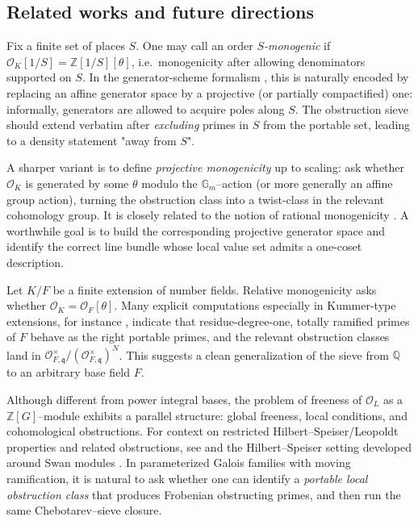 \documentclass[11pt,letterpaper]{amsart}
\theoremstyle{plain}
\theoremstyle{definition}
\theoremstyle{remark}
\theoremstyle{plain}
\begin{document}
\subsection{Related works and future directions}


Fix a finite set of places $S$. One may call an order \emph{$S$-monogenic} if
$\mathcal{O}_K[1/S]=\mathbb{Z}[1/S][\theta]$, i.e.\ monogenicity after allowing denominators
supported on $S$. In the generator-scheme formalism \cite{ABHS-I,ABHS-II}, this is naturally
encoded by replacing an affine generator space by a projective (or partially compactified) one:
informally, generators are allowed to acquire poles along $S$.
The obstruction sieve should extend verbatim after \emph{excluding} primes in $S$ from the portable set, leading to a density statement "away from $S$".

A sharper variant is to define \emph{projective monogenicity} up to scaling: ask whether $\mathcal{O}_K$ is generated by some $\theta$ modulo the $\mathbb{G}_m$--action (or more generally an affine group action), turning the obstruction class into a twist-class in
the relevant cohomology group. It is closely related to the notion of rational monogenicity \cite{Eve23, EG24}.
A worthwhile goal is to build the corresponding projective generator space and identify the correct
line bundle whose local value set admits a one-coset description. 


Let $K/F$ be a finite extension of number fields. Relative monogenicity asks whether
$\mathcal{O}_K=\mathcal{O}_F[\theta]$. Many explicit computations especially in Kummer-type extensions, for instance \cite{SmithRadical2021}, indicate that residue-degree-one,
totally ramified primes of $F$ behave as the right portable primes, and the relevant obstruction
classes land in $\mathcal{O}_{F,\mathfrak{q}}^\times/(\mathcal{O}_{F,\mathfrak{q}}^\times)^N$.
This suggests a clean generalization of the sieve from $\mathbb{Q}$ to an arbitrary base field $F$.


Although different from power integral bases, the problem of freeness of $\mathcal{O}_L$ as a
$\mathbb{Z}[G]$--module exhibits a parallel structure: global freeness, local conditions, and
cohomological obstructions. For context on restricted Hilbert--Speiser/Leopoldt properties and
related obstructions, see \cite{byott2011hilbertspeiser} and the Hilbert--Speiser setting developed
around Swan modules \cite{greither1999swan}.
In parameterized Galois families with moving ramification, it is natural to ask whether one can
identify a \emph{portable local obstruction class} that produces Frobenian obstructing primes,
and then run the same Chebotarev--sieve closure.
\end{document}
